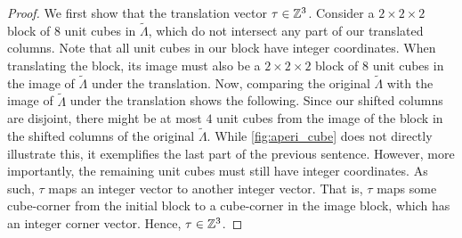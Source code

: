 \documentclass[../thesis.tex]{subfiles}
\begin{document}
\begin{proof}
We first show that the translation vector $\tau \in \mathbb{Z}^3$. Consider a $2\times 2\times 2$ block of $8$ unit cubes in $\widetilde{\Lambda}$, which do not intersect any part of our translated columns. Note that all unit cubes in our block have integer coordinates. When translating the block, its image must also be a $2\times 2\times 2$ block of $8$ unit cubes in the image of $\widetilde{\Lambda}$ under the translation. Now, comparing the original $\widetilde{\Lambda}$ with the image of $\widetilde{\Lambda}$ under the translation shows the following. Since our shifted columns are disjoint, there might be at most $4$ unit cubes from the image of the block in the shifted columns of the original $\widetilde{\Lambda}$. While \cref{fig:aperi_cube} does not directly illustrate this, it exemplifies the last part of the previous sentence. However, more importantly, the remaining unit cubes must still have integer coordinates. As such, $\tau$ maps an integer vector to another integer vector. That is, $\tau$ maps some cube-corner from the initial block to a cube-corner in the image block, which has an integer corner vector. Hence, $\tau \in \mathbb{Z}^3$. 


\end{proof}
\end{document}
